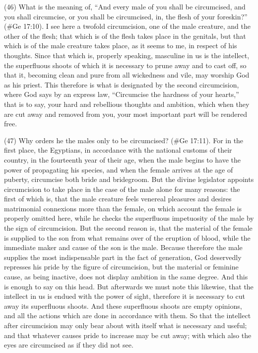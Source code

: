 (46) What is the meaning of, ``And every male of you shall be circumcised, and you shall
circumcise, or you shall be circumcised, in, the flesh of your foreskin?'' (\#Ge 17:10). I see
here a twofold circumcision, one of the male creature, and the other of the flesh; that which is of
the flesh takes place in the genitals, but that which is of the male creature takes place, as it seems
to me, in respect of his thoughts. Since that which is, properly speaking, masculine in us is the
intellect, the superfluous shoots of which it is necessary to prune away and to cast off, so that it,
becoming clean and pure from all wickedness and vile, may worship God as his priest. This
therefore is what is designated by the second circumcision, where God says by an express law,
``Circumcise the hardness of your hearts,'' that is to say, your hard and rebellious thoughts and
ambition, which when they are cut away and removed from you, your most important part will be
rendered free.

(47) Why orders he the males only to be circumcised? (\#Ge 17:11). For in the first place, the
Egyptians, in accordance with the national customs of their country, in the fourteenth year of their
age, when the male begins to have the power of propagating his species, and when the female
arrives at the age of puberty, circumcise both bride and bridegroom. But the divine legislator
appoints circumcision to take place in the case of the male alone for many reasons: the first of
which is, that the male creature feels venereal pleasures and desires matrimonial connexions
more than the female, on which account the female is properly omitted here, while he checks the
superfluous impetuosity of the male by the sign of circumcision. But the second reason is, that the
material of the female is supplied to the son from what remains over of the eruption of blood, while
the immediate maker and cause of the son is the male. Because therefore the male supplies the
most indispensable part in the fact of generation, God deservedly represses his pride by the figure
of circumcision, but the material or feminine cause, as being inactive, does not display ambition in
the same degree. And this is enough to say on this head. But afterwards we must note this
likewise, that the intellect in us is endued with the power of sight, therefore it is necessary to cut
away its superfluous shoots. And these superfluous shoots are empty opinions, and all the actions
which are done in accordance with them. So that the intellect after circumcision may only bear
about with itself what is necessary and useful; and that whatever causes pride to increase may be
cut away; with which also the eyes are circumcised as if they did not see.

